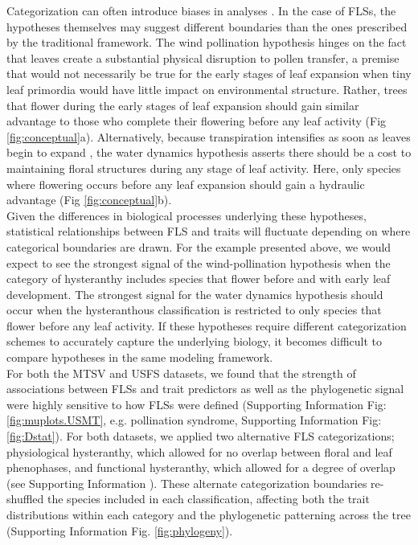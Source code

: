 \documentclass[11pt]{article}
\begin{document}
{\noindent Categorization can often introduce biases in analyses \citep{Royston2006}. In the case of FLSs, the hypotheses themselves may suggest different boundaries than the ones prescribed by the traditional framework. The wind pollination hypothesis hinges on the fact that leaves create a substantial physical disruption to pollen transfer, a premise that would not necessarily be true for the early stages of leaf expansion when tiny leaf primordia would have little impact on environmental structure. Rather, trees that flower during the early stages of leaf expansion should gain similar advantage to those who complete their flowering before any leaf activity (Fig \ref{fig:conceptual}a). Alternatively, because transpiration intensifies as soon as leaves begin to expand \citep{%
Wang2018}, the water dynamics hypothesis asserts there should be a cost to maintaining floral structures during any stage of leaf activity. Here, only species where flowering occurs before any leaf expansion should gain a hydraulic advantage (Fig \ref{fig:conceptual}b).\\ 

\noindent Given the differences in biological processes underlying these hypotheses, statistical relationships between FLS and traits will fluctuate depending on where categorical boundaries are drawn. For the example presented above, we would expect to see the strongest signal of the wind-pollination hypothesis when the category of hysteranthy includes species that flower before and with early leaf development. The strongest signal for the water dynamics hypothesis should occur when the hysteranthous classification is restricted to only species that flower before any leaf activity. If these hypotheses require different categorization schemes to accurately capture the underlying biology, it becomes difficult to compare hypotheses in the same modeling framework.\\

\noindent For both the MTSV and USFS datasets, we found that the strength of associations between FLSs and trait predictors as well as the phylogenetic signal were highly sensitive to how FLSs were defined (Supporting Information Fig: \ref{fig:muplots.USMT}, e.g. pollination syndrome, Supporting Information Fig: \ref{fig:Dstat}). For both datasets, we applied two alternative FLS categorizations; physiological hysteranthy, which allowed for no overlap between floral and leaf phenophases, and functional hysteranthy, which allowed for a degree of overlap (see Supporting Information ). These alternate categorization boundaries re-shuffled the species included in each classification, affecting both the trait distributions within each category and the phylogenetic patterning across the tree (Supporting Information Fig. \ref{fig:phylogeny}).\\ 
 
}
\end{document}
